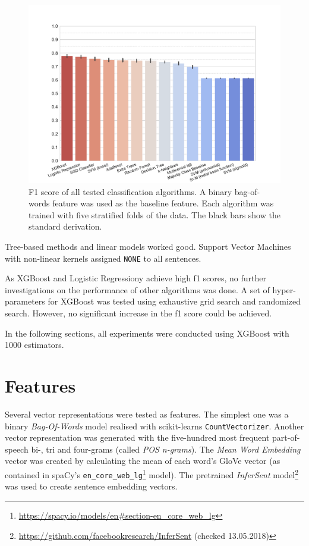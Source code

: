 \begin{figure}[tb]
\centering
\caption{F1 score of all tested classification algorithms. A binary bag-of-words feature was used as the baseline feature. Each algorithm was trained with five stratified folds of the data. The black bars show the standard derivation.}
\label{tbl:algo}
\includegraphics[width=1\linewidth]{images/classifier}
\end{figure}


Tree-based methods and linear models worked good. Support Vector Machines with non-linear kernels assigned \texttt{NONE} to all sentences.

As XGBoost and Logistic Regressiony achieve high f1 scores, no further investigations on the performance of other algorithms was done. A set of hyper-parameters for XGBoost was tested using exhaustive grid search and randomized search. However, no significant increase in the f1 score could be achieved.

In the following sections, all experiments were conducted using XGBoost with 1000 estimators.


\section{Features}
\label{sec:features}
Several vector representations were tested as features. The simplest one was a binary \emph{Bag-Of-Words} model realised with scikit-learns \texttt{CountVectorizer}. Another vector representation was generated with the five-hundred most frequent part-of-speech bi-, tri and four-grams (called \emph{POS n-grams}). The \emph{Mean Word Embedding} vector was created by calculating the mean of each word's GloVe vector (as contained in spaCy's \texttt{en\_core\_web\_lg}\footnote{\url{https://spacy.io/models/en\#section-en\_core\_web\_lg}} model). The pretrained \emph{InferSent} model\footnote{\url{https://github.com/facebookresearch/InferSent} (checked 13.05.2018)} was used to create sentence embedding vectors.

